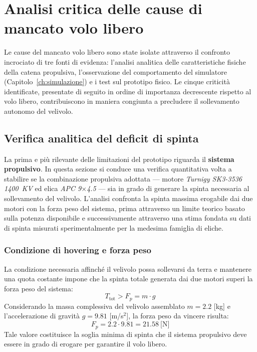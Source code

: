 \documentclass[11pt]{report}
\begin{document}
	\section{Analisi critica delle cause di mancato volo libero}
	\label{sec:analisi_cause}
	
	Le cause del mancato volo libero sono state isolate attraverso il confronto incrociato di tre fonti di evidenza: l'analisi analitica delle caratteristiche fisiche della catena propulsiva, l'osservazione del comportamento del simulatore (Capitolo~\ref{ch:simulazione}) e i test sul prototipo fisico. Le cinque criticità identificate, presentate di seguito in ordine di importanza decrescente rispetto al volo libero, contribuiscono in maniera congiunta a precludere il sollevamento autonomo del velivolo.
	
	\subsection{Verifica analitica del deficit di spinta}
	\label{sec:verifica_spinta}
	La prima e più rilevante delle limitazioni del prototipo riguarda il \textbf{sistema propulsivo}. In questa sezione si conduce una verifica quantitativa volta a stabilire se la combinazione propulsiva adottata --- motore \textit{Turnigy SK3-3536 1400~KV} ed elica \textit{APC 9$\times$4.5} --- sia in grado di generare la spinta necessaria al sollevamento del velivolo. L'analisi confronta la spinta massima erogabile dai due motori con la forza peso del sistema, prima attraverso un limite teorico basato sulla potenza disponibile e successivamente attraverso una stima fondata su dati di spinta misurati sperimentalmente per la medesima famiglia di eliche.
	
	\subsubsection*{Condizione di hovering e forza peso}
	La condizione necessaria affinché il velivolo possa sollevarsi da terra e mantenere una quota costante impone che la spinta totale generata dai due motori superi la forza peso del sistema:
	\begin{equation}
		T_\text{tot} > F_p = m \cdot g
		\label{eq:condizione_hovering}
	\end{equation}
	Considerando la massa complessiva del velivolo assemblato $m = 2.2$ [kg] e l'accelerazione di gravità $g = 9.81$ [m/s$^2$], la forza peso da vincere risulta:
	\begin{equation}
		F_p = 2.2 \cdot 9.81 = 21.58\ \text{[N]}
		\label{eq:forza_peso}
	\end{equation}
	Tale valore costituisce la soglia minima di spinta che il sistema propulsivo deve essere in grado di erogare per garantire il volo libero.
	
\end{document}

